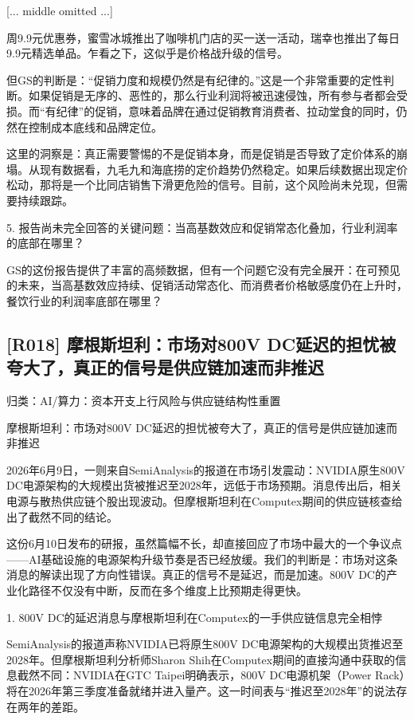 \documentclass[11pt]{ctexart}
\begin{document}
[... middle omitted ...]

周9.9元优惠券，蜜雪冰城推出了咖啡机门店的买一送一活动，瑞幸也推出了每日9.9元精选单品。乍看之下，这似乎是价格战升级的信号。

但GS的判断是：“促销力度和规模仍然是有纪律的。”这是一个非常重要的定性判断。如果促销是无序的、恶性的，那么行业利润将被迅速侵蚀，所有参与者都会受损。而“有纪律”的促销，意味着品牌在通过促销教育消费者、拉动堂食的同时，仍然在控制成本底线和品牌定位。

这里的洞察是：真正需要警惕的不是促销本身，而是促销是否导致了定价体系的崩塌。从现有数据看，九毛九和海底捞的定价趋势仍然稳定。如果后续数据出现定价松动，那将是一个比同店销售下滑更危险的信号。目前，这个风险尚未兑现，但需要持续跟踪。

5. 报告尚未完全回答的关键问题：当高基数效应和促销常态化叠加，行业利润率的底部在哪里？

GS的这份报告提供了丰富的高频数据，但有一个问题它没有完全展开：在可预见的未来，当高基数效应持续、促销活动常态化、而消费者价格敏感度仍在上升时，餐饮行业的利润率底部在哪里？

\subsection{[R018] 摩根斯坦利：市场对800V DC延迟的担忧被夸大了，真正的信号是供应链加速而非推迟}
{\small\color{refgray}归类：AI/算力：资本开支上行风险与供应链结构性重置}

摩根斯坦利：市场对800V DC延迟的担忧被夸大了，真正的信号是供应链加速而非推迟

2026年6月9日，一则来自SemiAnalysis的报道在市场引发震动：NVIDIA原生800V DC电源架构的大规模出货被推迟至2028年，远低于市场预期。消息传出后，相关电源与散热供应链个股出现波动。但摩根斯坦利在Computex期间的供应链核查给出了截然不同的结论。

这份6月10日发布的研报，虽然篇幅不长，却直接回应了市场中最大的一个争议点——AI基础设施的电源架构升级节奏是否已经放缓。我们的判断是：市场对这条消息的解读出现了方向性错误。真正的信号不是延迟，而是加速。800V DC的产业化路径不仅没有中断，反而在多个维度上比预期走得更快。

1. 800V DC的延迟消息与摩根斯坦利在Computex的一手供应链信息完全相悖

SemiAnalysis的报道声称NVIDIA已将原生800V DC电源架构的大规模出货推迟至2028年。但摩根斯坦利分析师Sharon Shih在Computex期间的直接沟通中获取的信息截然不同：NVIDIA在GTC Taipei明确表示，800V DC电源机架（Power Rack）将在2026年第三季度准备就绪并进入量产。这一时间表与“推迟至2028年”的说法存在两年的差距。
\end{document}
